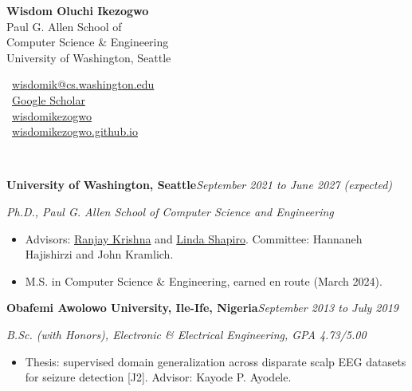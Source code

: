 \documentclass[10pt,letterpaper]{article}
\newcommand{\cvsec}[1]{\vspace{3.2mm}{\large\scshape\bfseries #1}\,\hrulefill\par\vspace{1.6mm}}
\newcommand{\entry}[3]{\textbf{#1}\hfill\textit{#2}\par\textit{#3}\par}
\begin{document}
\begin{minipage}[t]{0.62\textwidth}
  {\Huge\bfseries Wisdom Oluchi Ikezogwo}\\[2.2mm]
  Paul G. Allen School of\\
  Computer Science \& Engineering\\
  University of Washington, Seattle
\end{minipage}\hfill
\begin{minipage}[t]{0.36\textwidth}
  \raggedleft
  \faEnvelope[regular]~\href{mailto:wisdomik@cs.washington.edu}{wisdomik@cs.washington.edu}\\
  \faGraduationCap~\href{https://scholar.google.com/citations?user=gt5I_iYAAAAJ&hl=en}{Google Scholar}\\
  \faGithub~\href{https://github.com/wisdomikezogwo}{wisdomikezogwo}\\
  \faGlobe~\href{https://wisdomikezogwo.github.io}{wisdomikezogwo.github.io}
\end{minipage}

\cvsec{Education}
\entry{University of Washington, Seattle}{September 2021 to June 2027 (expected)}{Ph.D., Paul G. Allen School of Computer Science and Engineering}
\begin{itemize}[leftmargin=1.4em,itemsep=1pt,topsep=2pt]
  \item Advisors: \href{https://scholar.google.com/citations?user=IcqahyAAAAAJ}{Ranjay Krishna} and \href{https://scholar.google.com/citations?user=nBwaXUsAAAAJ}{Linda Shapiro}. Committee: Hannaneh Hajishirzi and John Kramlich.
  \item M.S. in Computer Science \& Engineering, earned en route (March 2024).
\end{itemize}
\vspace{1.5mm}
\entry{Obafemi Awolowo University, Ile-Ife, Nigeria}{September 2013 to July 2019}{B.Sc. (with Honors), Electronic \& Electrical Engineering, GPA 4.73/5.00}
\begin{itemize}[leftmargin=1.4em,itemsep=1pt,topsep=2pt]
  \item Thesis: supervised domain generalization across disparate scalp EEG datasets for seizure detection [J2]. Advisor: Kayode P. Ayodele.
\end{itemize}
\end{document}
